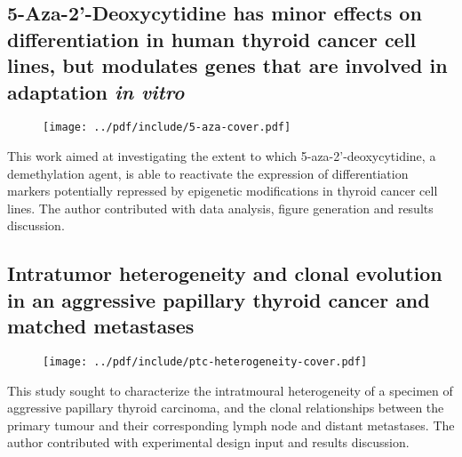 \clearpage

\subsection{5-Aza-2'-Deoxycytidine has minor effects on differentiation in human
  thyroid cancer cell lines, but modulates genes that are involved in adaptation
  \emph{in vitro}}
\begin{figure}[h]
  \texttt{[image: ../pdf/include/5-aza-cover.pdf]}
\end{figure}

This work aimed at investigating the extent to which 5-aza-2'-deoxycytidine, a
 demethylation agent, is able to reactivate the expression of
differentiation markers potentially repressed by epigenetic modifications in
thyroid cancer cell lines.\cite{dom_5-aza-2-deoxycytidine_2013} The author
contributed with data analysis, figure generation and results discussion.

\clearpage

\subsection{Intratumor heterogeneity and clonal evolution in an aggressive
  papillary thyroid cancer and matched metastases}
\begin{figure}[h]
  \texttt{[image: ../pdf/include/ptc-heterogeneity-cover.pdf]}
\end{figure}

This study sought to characterize the intratmoural heterogeneity of a specimen
of aggressive papillary thyroid carcinoma, and the clonal relationships between
the primary tumour and their corresponding lymph node and distant
metastases.\cite{pennec_intratumor_2015} The author contributed with
experimental design input and results discussion.

